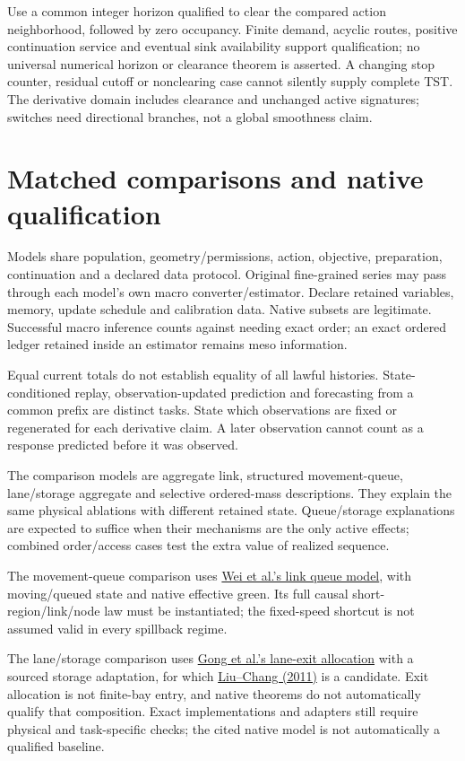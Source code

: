 \documentclass[10pt,a4paper]{article}
\newenvironment{revision}{\begingroup\color{revisionred}}{\par\endgroup}
\begin{document}
Use a common integer horizon qualified to clear the compared action
neighborhood, followed by zero occupancy. Finite demand, acyclic routes,
positive continuation service and eventual sink availability support
qualification; no universal numerical horizon or clearance theorem is
asserted. A changing stop counter, residual cutoff or nonclearing case
cannot silently supply complete TST. The derivative domain includes
clearance and unchanged active signatures; switches need directional
branches, not a global smoothness claim.

\section{Matched comparisons and native qualification}

Models share population, geometry/permissions, action, objective,
preparation, continuation and a declared data protocol.
Original fine-grained series may pass through each model's own macro
converter/estimator. Declare retained variables, memory, update schedule
and calibration data. Native subsets are legitimate. Successful macro
inference counts against needing exact order; an exact ordered ledger
retained inside an estimator remains meso information.

Equal current totals do not establish equality of all lawful histories.
State-conditioned replay, observation-updated prediction and forecasting
from a common prefix are distinct tasks. State which observations are
fixed or regenerated for each derivative claim. A later observation
cannot count as a response predicted before it was observed.

\begin{revision}
The comparison models are aggregate link, structured movement-queue,
lane/storage aggregate and selective ordered-mass descriptions. They
explain the same physical ablations with different retained state.
Queue/storage explanations are expected to suffice when their mechanisms
are the only active effects; combined order/access cases test the extra
value of realized sequence.
\end{revision}

The movement-queue comparison uses
\href{https://arxiv.org/html/2310.12249v2}{Wei et al.'s link queue model},
with moving/queued state and native effective green. Its full causal
short-region/link/node law must be instantiated; the fixed-speed shortcut
is not assumed valid in every spillback regime.

The lane/storage comparison uses
\href{https://www.sciencedirect.com/science/article/pii/S0191261525000578}
{Gong et al.'s lane-exit allocation} with a sourced storage adaptation,
for which \href{https://attap.umd.edu/wp-content/uploads/2022/05/TRC522.pdf}
{Liu--Chang (2011)} is a candidate. Exit allocation is not finite-bay
entry, and native theorems do not automatically qualify that composition.
Exact implementations and adapters still require physical and task-specific
checks; the cited native model is not automatically a qualified baseline.
\end{document}

